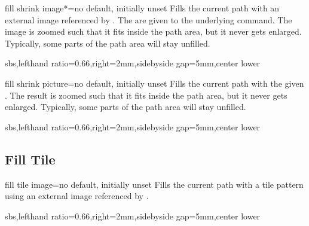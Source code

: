 \documentclass[a4paper,11pt]{article}
\begin{document}
\begin{docTikzKey}{fill shrink image*}{=}{no default, initially unset}
  Fills the current path with an external image referenced by .
  The  are given to the underlying  command.
  The image is zoomed such that it fits inside the path area, but it never
  gets enlarged.
  Typically, some parts of the path area will stay unfilled.
\begin{dispExample*}{sbs,lefthand ratio=0.66,right=2mm,sidebyside gap=5mm,center lower}
\end{dispExample*}
\end{docTikzKey}


\begin{docTikzKey}{fill shrink picture}{=}{no default, initially unset}
  Fills the current path with the given .
  The result is zoomed such that it fits inside the path area, but it never
  gets enlarged.
  Typically, some parts of the path area will stay unfilled.
\begin{dispExample*}{sbs,lefthand ratio=0.66,right=2mm,sidebyside gap=5mm,center lower}
\end{dispExample*}
\end{docTikzKey}


\clearpage
\subsection{Fill Tile}
\begin{docTikzKey}{fill tile image}{=}{no default, initially unset}
  Fills the current path with a tile pattern using an external image referenced by .
\begin{dispExample*}{sbs,lefthand ratio=0.66,right=2mm,sidebyside gap=5mm,center lower}
\end{dispExample*}
\end{docTikzKey}
\end{document}
